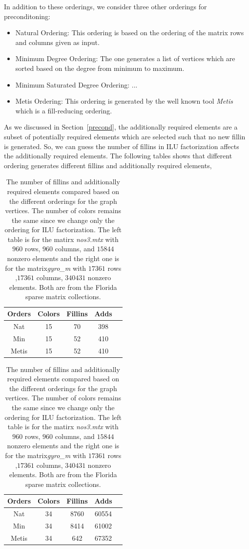 \documentclass[12pt, oneside]{book}
\begin{document}
In addition to these orderings, we consider three other orderings for preconditoning:
\begin{itemize}
\item Natural Ordering: This ordering is based on the ordering of the matrix rows and columns given as input.
\item Minimum Degree Ordering: The one generates a list of vertices which are sorted based on the degree from minimum to maximum.
\item Minimum Saturated Degree Ordering: ...
\item Metis Ordering\cite{metis,par-nested-disection}: This ordering is generated by the well known
tool \textit{Metis} which is a fill-reducing ordering.
\end{itemize}
As we discussed in Section~\ref{precond}, the additionally required elements are a subset of 
potentially required elements which are selected such that no new fillin is generated. 
So, we can guess the number of fillins in ILU factorization affects the additionally required elements.
The following tables shows that different ordering generates different fillins and additionally
required elements,
\begin{table}
\begin{tabular}{|c|c|c|c|c|}
\hline
Orders & Colors & Fillins & Adds \\\hline
Nat & 15 & 70 & 398 \\\hline
Min & 15 & 52 & 410 \\\hline
Metis & 15 & 52 & 410 \\\hline
\end{tabular}
\hfill
\begin{tabular}{|c|c|c|c|c|}
\hline
Orders & Colors & Fillins & Adds \\\hline
Nat & 34 & 8760 & 60554 \\\hline
Min & 34 & 8414 & 61002 \\\hline
Metis & 34 & 642 & 67352 \\\hline
\end{tabular}
\caption{The number of fillins and additionally required elements compared based on the different orderings
for the graph vertices. The number of colors remains the same since we change only the ordering for
ILU factorization.
The left table is for the matirx \textit{nos3.mtx} with $960$ rows, $960$ columns, and $15844$ nonzero elements 
and the right one is for the matrix\textit{gyro\_m} with $17361$ rows ,$17361$ columns, $340431$ nonzero elements.
Both are from the Florida sparse matrix collections.}
\label{ilu-effect}
\end{table}
\end{document}
